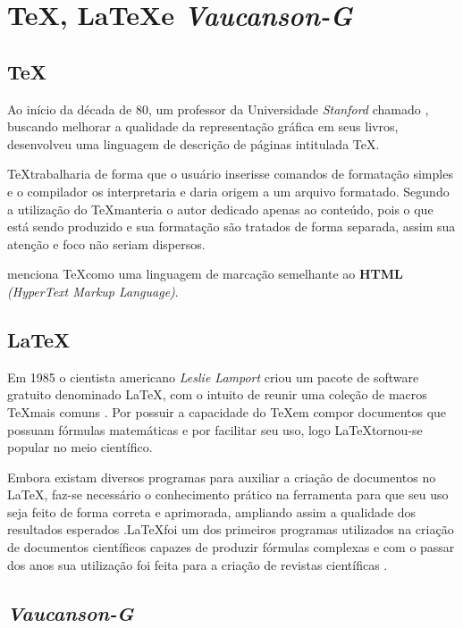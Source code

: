 \documentclass[a4paper,12pt,portuguese]{ufms-cpcx}
\begin{document}
\section{ \TeX, \LaTeX e \textit {Vaucanson-G}} %

\subsection{\TeX}
Ao início da década de 80, um professor da Universidade \textit{Stanford} chamado \cite{Donald Knuth}, buscando melhorar a qualidade da representação gráfica em seus livros, desenvolveu uma linguagem de descrição de páginas intitulada \TeX.

 \TeX trabalharia de forma que o usuário inserisse comandos de formatação simples e o compilador os interpretaria e daria origem a um arquivo formatado. Segundo \cite{Salzberg:2005:LWF:1099435.1099490} a utilização do \TeX manteria o autor dedicado apenas ao conteúdo, pois o que está sendo produzido e sua formatação são tratados de forma separada, assim sua atenção e foco não seriam dispersos.
 
\cite{Salzberg:2005:LWF:1099435.1099490}  menciona \TeX como uma linguagem de marcação semelhante ao \textbf{HTML} \textit{  (HyperText Markup Language)}.
 
 
\subsection{\LaTeX}
Em 1985 o cientista americano \textit{Leslie Lamport}\cite{Lamport, L 1985} criou um pacote de software gratuito denominado \LaTeX, com o intuito de reunir uma coleção de macros \TeX mais comuns \cite{Crowder:2000:LL:364412.364435}. Por possuir a capacidade do \TeX em compor documentos que possuam fórmulas matemáticas e por facilitar seu uso, logo \LaTeX tornou-se popular no meio científico.

Embora existam diversos programas para auxiliar a criação de documentos no \LaTeX, faz-se necessário o conhecimento prático na ferramenta para que seu uso seja feito de forma correta e aprimorada, ampliando assim a qualidade dos resultados esperados .\LaTeX foi um dos primeiros programas utilizados na criação de documentos científicos capazes de produzir fórmulas complexas e com o passar dos anos sua utilização foi feita para a criação de revistas científicas \cite{BritannicaOnlineAcademicEditionL}.


\subsection{\textit {Vaucanson-G}}
\end{document}
